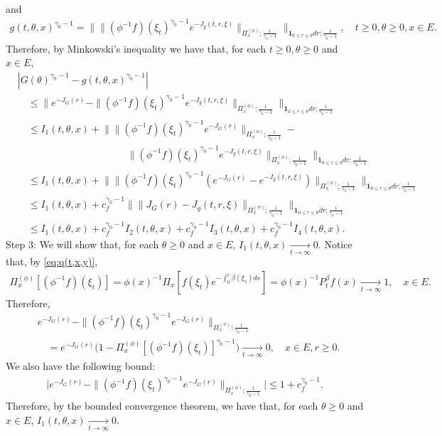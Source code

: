 \documentclass[UTF8]{pkuthss}
\theoremstyle{plain}
\theoremstyle{definition}
\numberwithin{equation}{section}
\begin{document}
	and
\begin{align}
	g(t,\theta,x)^{\gamma_0 - 1}
	=\Big\| \| (\phi^{-1}f)(\xi_t) ^{\gamma_0 - 1} e^{-J_g(t,r,\xi)} \|_{\Pi_x^{(\phi)};\frac{1}{\gamma_0 - 1}} \Big\|_{\mathbf 1_{0\leq r\leq \theta} dr;\frac{1}{\gamma_0 - 1}},
	\quad t\geq 0, \theta \geq 0, x\in E.
\end{align}	
	Therefore, by Minkowski's inequality we have that, for each $t\geq 0, \theta \geq 0$ and $x\in E$,
\begin{align}
	&|  G(\theta)^{\gamma_0 - 1} - g(t,\theta,x)^{\gamma_0 - 1} |
	\\&\quad \leq \Big\| e^{ - J_G(r)} - \| (\phi^{-1}f)(\xi_t)^{\gamma_0 - 1} e^{-J_g(t, r,\xi)} \|_{\Pi_x^{(\phi)};\frac{1}{\gamma_0 - 1}} \Big\|_{\mathbf 1_{0\leq r\leq \theta} dr;\frac{1}{\gamma_0 - 1}}
	\\&\quad \leq I_1(t,\theta,x) + \Big\| \| (\phi^{-1}f)(\xi_t)^{\gamma_0 - 1} e^{-J_G(r)} \|_{\Pi_x^{(\phi)};\frac{1}{\gamma_0 - 1}} -
	\\&\quad \qquad \qquad \qquad \qquad \qquad \| (\phi^{-1}f)(\xi_t)^{\gamma_0 - 1} e^{-J_g(t,r,\xi)} \|_{\Pi_x^{(\phi)};\frac{1}{\gamma_0 - 1}} \Big\|_{\mathbf 1_{0\leq r\leq \theta} dr;\frac{1}{\gamma_0 - 1}}
	\\&\quad \leq I_1(t,\theta,x) + \Big\| \|  (\phi^{-1}f)(\xi_t)^{\gamma_0 - 1} ( e^{-J_G(r)} - e^{-J_g(t,r,\xi)} )  \|_{\Pi_x^{(\phi)};\frac{1}{\gamma_0 - 1}} \Big\|_{\mathbf 1_{0\leq r\leq \theta} dr;\frac{1}{\gamma_0 - 1}}
	\\&\quad \leq I_1(t,\theta,x) + c_f^{\gamma_0 - 1}\Big\| \|  J_G(r) -J_g(t,r,\xi)  \|_{\Pi_x^{(\phi)};\frac{1}{\gamma_0 - 1}} \Big\|_{\mathbf 1_{0\leq r\leq \theta} dr;\frac{1}{\gamma_0 - 1}}
	\\&\quad \leq I_1(t,\theta,x) + c_f^{\gamma_0 - 1} I_2(t,\theta,x) +c_f^{\gamma_0 - 1} I_3(t,\theta,x)+c_f^{\gamma_0 - 1} I_4(t,\theta,x).
\end{align}	
	Step 3: We will show that, for each $\theta \geq 0$ and $x\in E$, $I_1(t,\theta,x) \xrightarrow[t\to \infty]{} 0$.
	Notice that,
	by \eqref{eq:q(t,x,y)},
\begin{align}
	\Pi_x^{(\phi)} [(\phi^{-1}f)(\xi_t)]
	= \phi(x)^{-1}\Pi_x[f(\xi_t) e^{- \int_0^t \beta(\xi_s) ds}]
	= \phi(x)^{-1} P^\beta_t f(x)
	\xrightarrow[t\to \infty]{} 1,
	\quad x\in E.
\end{align}
	Therefore,
\begin{align}
	&e^{ - J_G(r)} - \| (\phi^{-1}f)(\xi_t)^{\gamma_0 - 1} e^{-J_G(r)} \|_{\Pi_x^{(\phi)};\frac{1}{\gamma_0 - 1}}
	\\&\quad =e^{ - J_G(r)} \Big( 1   -  \Pi_x^{(\phi)}[ (\phi^{-1}f)(\xi_t) ]^{\gamma_0 - 1}   \Big)
	\xrightarrow[t\to \infty]{} 0,
	\quad x\in E, r\geq 0.
\end{align}
	We also have the following bound:
\begin{align}
	\Big| e^{ - J_G(r)} - \| (\phi^{-1}f)(\xi_t)^{\gamma_0 - 1} e^{-J_G(r)} \|_{\Pi_x^{(\phi)};\frac{1}{\gamma_0 - 1}} \Big|
	\leq 1+ c_f^{\gamma_0 - 1}.
\end{align}
	Therefore, by the bounded convergence theorem, we have that, for each $\theta \geq 0$ and $x\in E$, $I_1(t,\theta, x) \xrightarrow[t\to \infty]{} 0$.
	
\end{document}
